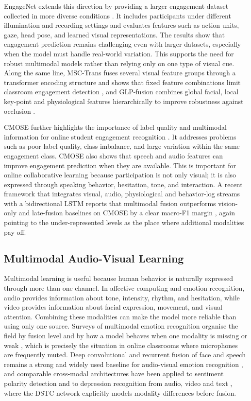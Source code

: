 \documentclass[journal]{IEEEtran}
\begin{document}
EngageNet extends this direction by providing a larger engagement dataset collected in more diverse conditions \cite{singh2023engagenet}. It includes participants under different illumination and recording settings and evaluates features such as action units, gaze, head pose, and learned visual representations. The results show that engagement prediction remains challenging even with larger datasets, especially when the model must handle real-world variation. This supports the need for robust multimodal models rather than relying only on one type of visual cue. Along the same line, MSC-Trans fuses several visual feature groups through a transformer encoding structure and shows that fixed feature combinations limit classroom engagement detection \cite{xie2025msctrans}, and GLP-fusion combines global facial, local key-point and physiological features hierarchically to improve robustness against occlusion \cite{qin2026glpfusion}.

CMOSE further highlights the importance of label quality and multimodal information for online student engagement recognition \cite{wu2024cmose}. It addresses problems such as poor label quality, class imbalance, and large variation within the same engagement class. CMOSE also shows that speech and audio features can improve engagement prediction when they are available. This is important for online collaborative learning because participation is not only visual; it is also expressed through speaking behavior, hesitation, tone, and interaction. A recent framework that integrates visual, audio, physiological and behavior-log streams with a bidirectional LSTM reports that multimodal fusion outperforms vision-only and late-fusion baselines on CMOSE by a clear macro-F1 margin \cite{dan2026multimodal}, again pointing to the under-represented levels as the place where additional modalities pay off.

\subsection{Multimodal Audio-Visual Learning}

Multimodal learning is useful because human behavior is naturally expressed through more than one channel. In affective computing and emotion recognition, audio provides information about tone, intensity, rhythm, and hesitation, while video provides information about facial expression, movement, and visual attention. Combining these modalities can make the model more reliable than using only one source. Surveys of multimodal emotion recognition organise the field by fusion level and by how a model behaves when one modality is missing or weak \cite{li2025mersurvey}, which is precisely the situation in online classrooms where microphones are frequently muted. Deep convolutional and recurrent fusion of face and speech remains a strong and widely used baseline for audio-visual emotion recognition \cite{taware2025mer}, and comparable cross-modal architectures have been applied to sentiment polarity detection \cite{hegde2025sentiment} and to depression recognition from audio, video and text \cite{lu2026dstc}, where the DSTC network explicitly models modality differences before fusion.
\end{document}
